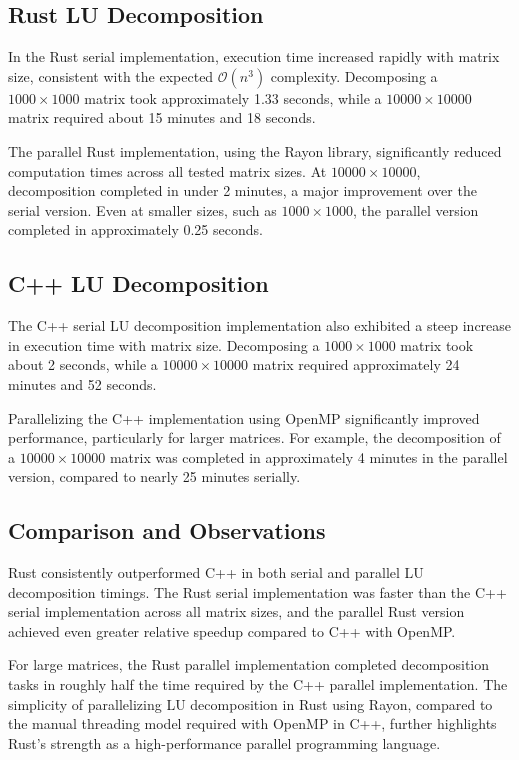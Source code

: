 \documentclass[12pt]{article}
\begin{document}
\subsection{Rust LU Decomposition}

In the Rust serial implementation, execution time increased rapidly with matrix size, consistent with the expected \( \mathcal{O}(n^3) \) complexity.
Decomposing a \(1000 \times 1000\) matrix took approximately 1.33 seconds, while a \(10000 \times 10000\) matrix required about 15 minutes and 18 seconds.

The parallel Rust implementation, using the Rayon library, significantly reduced computation times across all tested matrix sizes. At \(10000 \times 10000\),
decomposition completed in under 2 minutes, a major improvement over the serial version. Even at smaller sizes, such as \(1000 \times 1000\), the parallel
version completed in approximately 0.25 seconds.

\subsection{C++ LU Decomposition}

The C++ serial LU decomposition implementation also exhibited a steep increase in execution time with matrix size. Decomposing a \(1000 \times 1000\) matrix
took about 2 seconds, while a \(10000 \times 10000\) matrix required approximately 24 minutes and 52 seconds.

Parallelizing the C++ implementation using OpenMP significantly improved performance, particularly for larger matrices. For example, the decomposition of
a \(10000 \times 10000\) matrix was completed in approximately 4 minutes in the parallel version, compared to nearly 25 minutes serially.

\subsection{Comparison and Observations}

Rust consistently outperformed C++ in both serial and parallel LU decomposition timings. The Rust serial implementation was faster than the C++ serial
implementation across all matrix sizes, and the parallel Rust version achieved even greater relative speedup compared to C++ with OpenMP.

For large matrices, the Rust parallel implementation completed decomposition tasks in roughly half the time required by the C++ parallel implementation.
The simplicity of parallelizing LU decomposition in Rust using Rayon, compared to the manual threading model required with OpenMP in C++, further highlights
Rust's strength as a high-performance parallel programming language.
\end{document}
